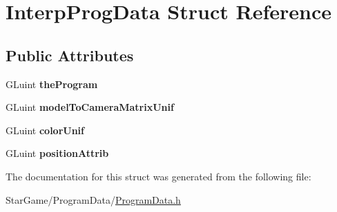 \hypertarget{struct_interp_prog_data}{\section{Interp\-Prog\-Data Struct Reference}
\label{struct_interp_prog_data}
}
\subsection*{Public Attributes}
\begin{DoxyCompactItemize}
\item 
\hypertarget{struct_interp_prog_data_a5186f183e8164c084b53ac737b47febc}{G\-Luint {\bfseries the\-Program}}\label{struct_interp_prog_data_a5186f183e8164c084b53ac737b47febc}

\item 
\hypertarget{struct_interp_prog_data_ae957586977c7cb6f5ce7d1971adddc72}{G\-Luint {\bfseries model\-To\-Camera\-Matrix\-Unif}}\label{struct_interp_prog_data_ae957586977c7cb6f5ce7d1971adddc72}

\item 
\hypertarget{struct_interp_prog_data_ae04cf0fd3d1aa52d8614fdb5e4af752d}{G\-Luint {\bfseries color\-Unif}}\label{struct_interp_prog_data_ae04cf0fd3d1aa52d8614fdb5e4af752d}

\item 
\hypertarget{struct_interp_prog_data_ac24094fef2aaf05fe686edb4ea14e264}{G\-Luint {\bfseries position\-Attrib}}\label{struct_interp_prog_data_ac24094fef2aaf05fe686edb4ea14e264}

\end{DoxyCompactItemize}


The documentation for this struct was generated from the following file\-:\begin{DoxyCompactItemize}
\item 
Star\-Game/\-Program\-Data/\hyperlink{_program_data_8h}{Program\-Data.\-h}\end{DoxyCompactItemize}
